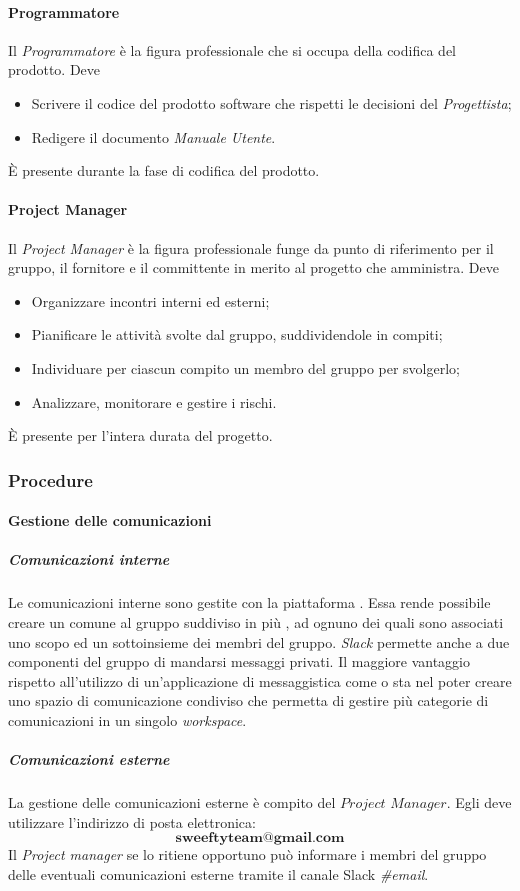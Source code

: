 \paragraph{Programmatore} \Spazio
Il \emph{Programmatore} è la figura professionale che si occupa della codifica del prodotto. Deve
\begin{itemize}
	\item Scrivere il codice  del prodotto software che rispetti le decisioni del \emph{Progettista};
	\item Redigere il documento \emph{Manuale Utente}.
\end{itemize}
È presente durante la fase di codifica del prodotto.
\paragraph{Project Manager} \Spazio
Il \emph{Project Manager} è la figura professionale funge da punto di riferimento per il gruppo, il fornitore e il committente in merito al progetto che amministra. Deve
\begin{itemize}
	\item Organizzare incontri interni ed esterni;
	\item Pianificare le attività svolte dal gruppo, suddividendole in compiti;
	\item Individuare per ciascun compito un membro del gruppo per svolgerlo;
	\item Analizzare, monitorare e gestire i rischi.
\end{itemize}
È presente per l'intera durata del progetto.
\subsubsection{Procedure}
\paragraph{Gestione delle comunicazioni}
\subparagraph{Comunicazioni interne} \Spazio
\label{comInterne}
Le comunicazioni interne sono gestite con la piattaforma . Essa rende possibile creare un  comune al gruppo suddiviso in più , ad ognuno dei quali sono associati uno scopo ed un sottoinsieme dei membri del gruppo. \emph{Slack} permette anche a due componenti del gruppo di mandarsi messaggi privati. Il maggiore vantaggio rispetto all'utilizzo di un'applicazione di messaggistica come  o  sta nel poter creare uno spazio di comunicazione condiviso che permetta di gestire più categorie di comunicazioni in un singolo \emph{workspace}. %
\subparagraph{Comunicazioni esterne} \Spazio
La gestione delle comunicazioni esterne è compito del $Project$ $Manager$. Egli deve utilizzare l'indirizzo di posta elettronica:
$$\textbf{sweeftyteam@gmail.com}$$
Il \emph{Project manager} se lo ritiene opportuno può informare i membri del gruppo delle eventuali comunicazioni esterne tramite il canale Slack \emph{\#email}.

